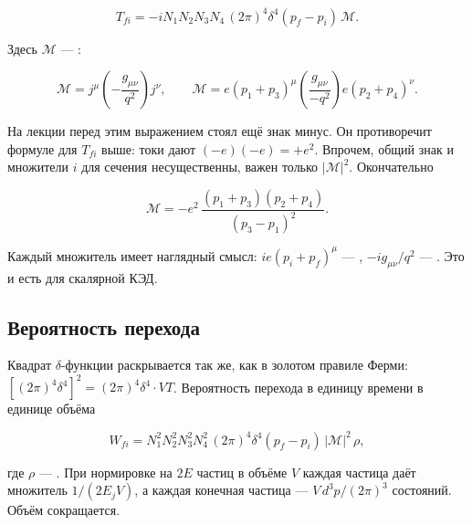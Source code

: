 \documentclass[../final.tex]{subfiles}
\begin{document}
\begin{equation*}
    T_{fi}
    =
    -iN_1N_2N_3N_4\,
    (2\pi)^4\delta^4(p_f-p_i)\,
    \mathcal M.
\end{equation*}

Здесь $\mathcal M$ --- :

\begin{equation*}
    \mathcal M
    =
    j^\mu\left(-\frac{g_{\mu\nu}}{q^2}\right)j^\nu,
    \qquad
    \mathcal M
    =
    e\left(p_1+p_3\right)^\mu
    \left(\frac{g_{\mu\nu}}{-q^2}\right)
    e\left(p_2+p_4\right)^\nu.
\end{equation*}

На лекции перед этим выражением стоял ещё знак минус. Он
противоречит формуле для $T_{fi}$ выше: токи дают $(-e)(-e)=+e^2$.
Впрочем, общий знак и множители $i$ для сечения несущественны,
важен только $|\mathcal M|^2$. Окончательно

\begin{equation*}
    \mathcal M
    =
    -e^2\,
    \frac{\left(p_1+p_3\right)\left(p_2+p_4\right)}
         {\left(p_3-p_1\right)^2}.
\end{equation*}

Каждый множитель имеет наглядный смысл:
$ie(p_i+p_f)^\mu$ --- ,
$-ig_{\mu\nu}/q^2$ --- .
Это и есть  для скалярной КЭД.


\subsection{Вероятность перехода}

Квадрат $\delta$-функции раскрывается так же, как в золотом правиле
Ферми: $\left[(2\pi)^4\delta^4\right]^2=(2\pi)^4\delta^4\cdot VT$.
Вероятность перехода в единицу времени в единице объёма

\begin{equation*}
    W_{fi}
    =
    N_1^2N_2^2N_3^2N_4^2\,
    (2\pi)^4\delta^4(p_f-p_i)\,
    |\mathcal M|^2\,
    \rho,
\end{equation*}

где $\rho$ --- .
При нормировке на $2E$ частиц в объёме $V$ каждая частица
даёт множитель $1/(2E_jV)$, а каждая конечная частица ---
$V\,d^3p/(2\pi)^3$ состояний. Объём сокращается.
\end{document}
